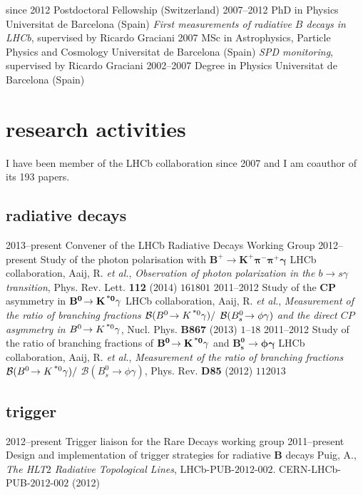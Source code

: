   \cventry
    {since 2012}
    {Postdoctoral Fellowship}
    {\epfl(Switzerland)}
    {}
  \cventry
    {2007--2012}
    {PhD in Physics}
    {Universitat de Barcelona (Spain)}
    {\emph{First measurements of radiative $B$ decays in LHCb}, supervised by Ricardo Graciani}
  \cventry
    {2007}
    {MSc in Astrophysics, Particle Physics and Cosmology}
    {Universitat de Barcelona (Spain)}
    {\emph{SPD monitoring}, supervised by Ricardo Graciani}
  \cventry
    {2002--2007}
    {Degree in Physics}
    {Universitat de Barcelona (Spain)}
    {}

\section{research activities}
I have been member of the LHCb collaboration since 2007 and I am coauthor of its 193 papers.


\subsection{radiative decays}
    \cventry
    {2013--present}
    {Convener of the LHCb Radiative Decays Working Group}
    {}
    {}
    \cventry
    {2012--present}
    {Study of the photon polarisation with $\mathbf{B^+\!\to K^+\pi^-\pi^+\gamma}$}
    {}
    {LHCb collaboration, Aaij, R. \textit{et al.}, \textit{Observation of photon polarization in the $b \to s\gamma$ transition}, Phys. Rev. Lett. \textbf{112} (2014) $161801$}
    \cventry
    {2011--2012}
    {Study of the $\mathbf{CP}$ asymmetry in $\mathbf{B^0\!\to K^{\text{\,*}0}\gamma}$}
    {}
    {LHCb collaboration, Aaij, R. \textit{et al.}, \textit{Measurement of the ratio of branching fractions ${\cal B}(B^0\!\to K^{\text{\,*}0} \gamma) /$ ${\cal B}(B^0_s\!\to \phi \gamma)$ and the direct $CP$ asymmetry in $B^0\!\to K^{\text{\,*}0} \gamma$}, Nucl. Phys. \textbf{B867} (2013) $1$--$18$}
    \cventry
    {2011--2012}
    {Study of the ratio of branching fractions of $\mathbf{B^0\!\to K^{\text{\,*}0}\gamma}$ and $\mathbf{B^0_s\!\to \phi\gamma}$}
    {}
    {LHCb collaboration, Aaij, R. \textit{et al.}, \textit{Measurement of the ratio of branching fractions $\mathcal{B}(B^0\!\to K^{\text{\,*}0}\gamma)/$ $\mathcal{B}(B_s^0\to\phi\gamma)$}, Phys. Rev. \textbf{D85} (2012) $112013$}

\subsection{trigger}
    \cventry
    {2012--present}
    {Trigger liaison for the Rare Decays working group}
    {}
    {}
    \cventry
    {2011--present}
    {Design and implementation of trigger strategies for radiative $\mathbf{B}$ decays}
    {}
    {Puig, A., \textit{The HLT$2$ Radiative Topological Lines}, LHCb-PUB-$2012$-$002$. CERN-LHCb-PUB-$2012$-$002$ (2012)}

